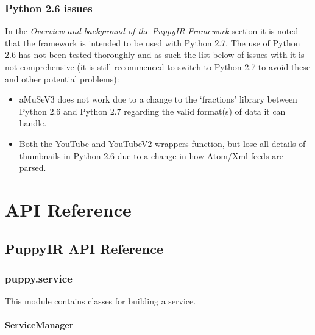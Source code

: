 \documentclass[letterpaper,10pt,english]{sphinxmanual}
\begin{document}
\subsection{Python 2.6 issues}
\label{issues:python-2-6-issues}
In the {\hyperref[overview:overview]{\emph{Overview and background of the PuppyIR Framework}}} section it is noted that the framework is intended to be used with Python 2.7. The use of Python 2.6 has not been tested thoroughly and as such the list below of issues with it is not comprehensive (it is still recommenced to switch to Python 2.7 to avoid these and other potential problems):
\begin{itemize}
\item {} 
aMuSeV3 does not work due to a change to the `fractions' library between Python 2.6 and Python 2.7 regarding the valid format(s) of data it can handle.

\item {} 
Both the YouTube and YouTubeV2 wrappers function, but lose all details of thumbnails in Python 2.6 due to a change in how Atom/Xml feeds are parsed.

\end{itemize}


\chapter{API Reference}
\label{index:api-reference}

\section{PuppyIR API Reference}
\label{api2.0:api}\label{api2.0::doc}\label{api2.0:puppyir-api-reference}

\subsection{puppy.service}
\label{api2.0:puppy-service}
This module contains classes for building a service.
\label{api2.0:module-puppy.service}

\subsubsection{ServiceManager}
\label{api2.0:servicemanager}
\end{document}

